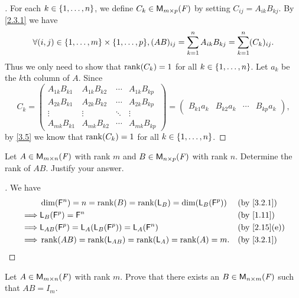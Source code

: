 \begin{proof}[]
  For each \(k \in \left\lbrace1, \dots, n\right\rbrace\), we define \(C_k \in \mathsf{M}_{{m} \times p}({\mathit{F}})\) by setting \(C_{i j} = A_{i k} B_{k j}\).
  By \cref{2.3.1} we have
  \[
    \forall (i, j) \in \set{1, \dots, m} \times \set{1, \dots, p}, (AB)_{i j} = \sum_{k = 1}^n A_{i k} B_{k j} = \sum_{k = 1}^n (C_k)_{i j}.
  \]
  Thus we only need to show that \(\rk{C_k} = 1\) for all \(k \in \left\lbrace1, \dots, n\right\rbrace\).
  Let \(a_k\) be the \(k\)th column of \(A\).
  Since
  \[
    C_k = \begin{pmatrix}
      A_{1 k} B_{k 1} & A_{1 k} B_{k 2} & \cdots & A_{1 k} B_{k p} \\
      A_{2 k} B_{k 1} & A_{2 k} B_{k 2} & \cdots & A_{2 k} B_{k p} \\
      \vdots          & \vdots          & \ddots & \vdots          \\
      A_{m k} B_{k 1} & A_{m k} B_{k 2} & \cdots & A_{m k} B_{k p}
    \end{pmatrix} = \begin{pmatrix}
      B_{k 1} a_k & B_{k 2} a_k & \cdots & B_{k p} a_k
    \end{pmatrix},
  \]
  by \cref{3.5} we know that \(\rk{C_k} = 1\) for all \(k \in \left\lbrace1, \dots, n\right\rbrace\).
\end{proof}

\begin{ex}\label{ex:3.2.19}
  Let \(A \in \mathsf{M}_{{m} \times n}({\mathit{F}})\) with rank \(m\) and \(B \in \mathsf{M}_{{n} \times p}({\mathit{F}})\) with rank \(n\).
  Determine the rank of \(AB\).
  Justify your answer.
\end{ex}

\begin{proof}[]
  We have
  \begin{align*}
             & \dim(\vs{F}^n) = n = \rk{B} = \rk{\L_B} = \dim(\L_B(\vs{F}^p)) &  & \text{(by \cref{3.2.1})}   \\
    \implies & \L_B(\vs{F}^p) = \vs{F}^n                                      &  & \text{(by \cref{1.11})}    \\
    \implies & \L_{AB}(\vs{F}^p) = \L_A(\L_B(\vs{F}^p)) = \L_A(\vs{F}^n)      &  & \text{(by \cref{2.15}(e))} \\
    \implies & \rk{AB} = \rk{\L_{AB}} = \rk{\L_A} = \rk{A} = m.               &  & \text{(by \cref{3.2.1})}
  \end{align*}
\end{proof}

\setcounter{ex}{20}
\begin{ex}\label{ex:3.2.21}
  Let \(A \in \mathsf{M}_{{m} \times n}({\mathit{F}})\) with rank \(m\).
  Prove that there exists an \(B \in \mathsf{M}_{{n} \times m}({\mathit{F}})\) such that \(AB = I_m\).
\end{ex}

